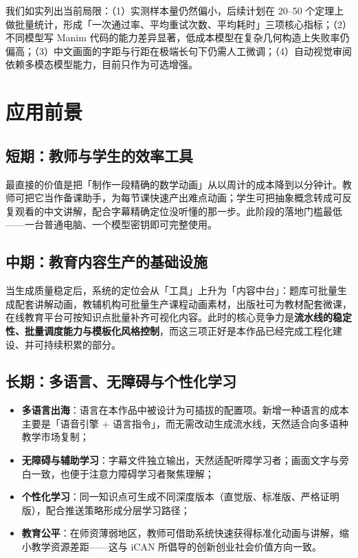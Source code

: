 \documentclass[11pt,a4paper]{ctexart}
\begin{document}
我们如实列出当前局限：（1）实测样本量仍然偏小，后续计划在 20--50 个定理上做批量统计，形成「一次通过率、平均重试次数、平均耗时」三项核心指标；（2）不同模型写 Manim 代码的能力差异显著，低成本模型在复杂几何构造上失败率仍偏高；（3）中文画面的字距与行距在极端长句下仍需人工微调；（4）自动视觉审阅依赖多模态模型能力，目前只作为可选增强。

\section{应用前景}

\subsection{短期：教师与学生的效率工具}

最直接的价值是把「制作一段精确的数学动画」从以周计的成本降到以分钟计。教师可把它当作备课助手，为每节课快速产出难点动画；学生可把抽象概念转成可反复观看的中文讲解，配合字幕精确定位没听懂的那一步。此阶段的落地门槛最低——一台普通电脑、一个模型密钥即可完整使用。

\subsection{中期：教育内容生产的基础设施}

当生成质量稳定后，系统的定位会从「工具」上升为「内容中台」：题库可批量生成配套讲解动画，教辅机构可批量生产课程动画素材，出版社可为教材配套微课，在线教育平台可按知识点批量补齐可视化内容。此时的核心竞争力是\textbf{流水线的稳定性、批量调度能力与模板化风格控制}，而这三项正好是本作品已经完成工程化建设、并可持续积累的部分。

\subsection{长期：多语言、无障碍与个性化学习}

\begin{itemize}
  \item \textbf{多语言出海}：语言在本作品中被设计为可插拔的配置项。新增一种语言的成本主要是「语音引擎 + 语言指令」，而无需改动生成流水线，天然适合向多语种教学市场复制；
  \item \textbf{无障碍与辅助学习}：字幕文件独立输出，天然适配听障学习者；画面文字与旁白一致，也便于注意力障碍学习者聚焦理解；
  \item \textbf{个性化学习}：同一知识点可生成不同深度版本（直觉版、标准版、严格证明版），配合推送策略形成分层学习路径；
  \item \textbf{教育公平}：在师资薄弱地区，教师可借助系统快速获得标准化动画与讲解，缩小教学资源差距——这与 iCAN 所倡导的创新创业社会价值方向一致。
\end{itemize}
\end{document}
